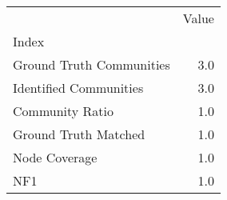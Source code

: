 \begin{tabular}{lr}
\toprule
{} &  Value \\
Index                    &        \\
\midrule
Ground Truth Communities &    3.0 \\
Identified Communities   &    3.0 \\
Community Ratio          &    1.0 \\
Ground Truth Matched     &    1.0 \\
Node Coverage            &    1.0 \\
NF1                      &    1.0 \\
\bottomrule
\end{tabular}
